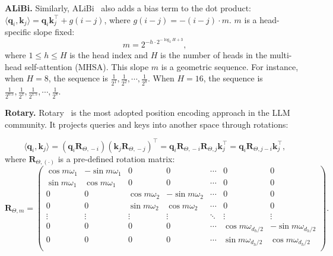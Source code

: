 \documentclass{article} \usepackage{iclr2025_conference,times}
\begin{document}
\textbf{ALiBi.} Similarly, ALiBi~\citep{press2021train} also adds a bias term to the dot product: $\langle\boldsymbol{q}_i\textrm{,}\,\boldsymbol{k}_j\rangle=\boldsymbol{q}_i\boldsymbol{k}_j^\top+g(i-j)$, where $g(i-j)=-(i-j)\cdot m$. $m$ is a head-specific slope fixed:
\begin{equation}
    m=2^{-h\cdot 2^{-\log_2 H +3}}\textrm{,}
\end{equation}
where $1\leq h\leq H$ is the head index and $H$ is the number of heads in the multi-head self-attention (MHSA). This slope $m$ is a geometric sequence. For instance, when $H=8$, the sequence is $\frac{1}{2^1}\textrm{,}\,\frac{1}{2^2}\textrm{,}\,\cdots\textrm{,}\,\frac{1}{2^8}$. When $H=16$, the sequence is $\frac{1}{2^{0.5}}\textrm{,}\,\frac{1}{2^1}\textrm{,}\,\frac{1}{2^{1.5}}\textrm{,}\,\cdots\textrm{,}\,\frac{1}{2^8}$.

\textbf{Rotary.} Rotary~\citep{su2024roformer} is the most adopted position encoding approach in the LLM community. It projects queries and keys into another space through rotations: 

\begin{equation}
    \langle\boldsymbol{q}_i\textrm{,}\, \boldsymbol{k}_j\rangle=\left(\boldsymbol{q}_i\boldsymbol{R}_{\Theta\textrm{,}\,-i}\right)\left( \boldsymbol{k}_j\boldsymbol{R}_{\Theta\textrm{,}\,-j}\right)^\top=\boldsymbol{q}_i\boldsymbol{R}_{\Theta\textrm{,}\,-i}\boldsymbol{R}_{\Theta\textrm{,}\,j}\boldsymbol{k}_j^\top=\boldsymbol{q}_i\boldsymbol{R}_{\Theta\textrm{,}\,j-i} \boldsymbol{k}_j^\top\textrm{,}
\end{equation}
where $\boldsymbol{R}_{\Theta\textrm{,}\,(\cdot)}$ is a pre-defined rotation matrix:
\begin{equation}\boldsymbol{R}_{\Theta,m}=
\left(
    \begin{array}{ccccccc}
       \cos m\omega_1  & -\sin m\omega_1 & 0 & 0 & \cdots & 0 & 0 \\
        \sin m\omega_1  & \cos m\omega_1 & 0 & 0 & \cdots & 0 & 0 \\
        0 & 0 & \cos m\omega_2  & -\sin m\omega_2  &\cdots & 0 & 0  \\
        0 & 0 & \sin m\omega_2  & \cos m\omega_2  &\cdots & 0 & 0  \\
        \vdots & \vdots & \vdots & \vdots & \ddots & \vdots & \vdots \\
        0 & 0 &  0 & 0 & \cdots & \cos m\omega_{d_h/2}  & -\sin m\omega_{d_h/2}\\
         0 & 0 &  0 & 0 & \cdots &  \sin m\omega_{d_h/2}  & \cos m\omega_{d_h/2}\\
    \end{array}
    \right)\textrm{.}
\end{equation}
\end{document}

